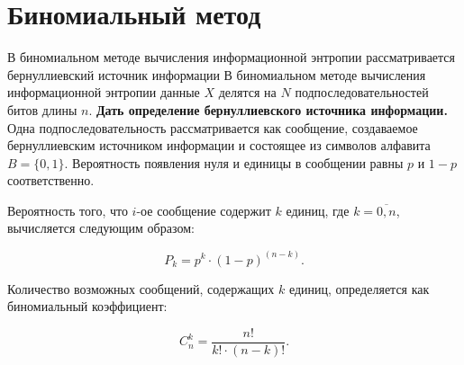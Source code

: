 
\section{Биномиальный метод}

В биномиальном методе вычисления информационной энтропии рассматривается бернуллиевский источник информации
В биномиальном методе вычисления информационной энтропии \cite{binomial-method} данные $X$ делятся на $N$ подпоследовательностей битов длины $n$. \textbf{Дать определение бернуллиевского источника информации.} Одна подпоследовательность рассматривается как сообщение, создаваемое бернуллиевским источником информации и состоящее из символов алфавита $B = \{0, 1\}$. Вероятность появления нуля и единицы в сообщении равны $p$ и $1 - p$ соответственно.

Вероятность того, что $i$-ое сообщение содержит $k$ единиц, где $k = \overline{0, n}$, вычисляется следующим образом:

\begin{equation}\label{pk}
	P_{k} = p^k \cdot (1 - p)^{(n - k)}.
\end{equation} 

Количество возможных сообщений, содержащих $k$ единиц, определяется как биномиальный коэффициент:

\begin{equation}\label{binomial-coefficient}
	C_{n}^k = \frac{n!}{k! \cdot (n - k)!}.
\end{equation}

